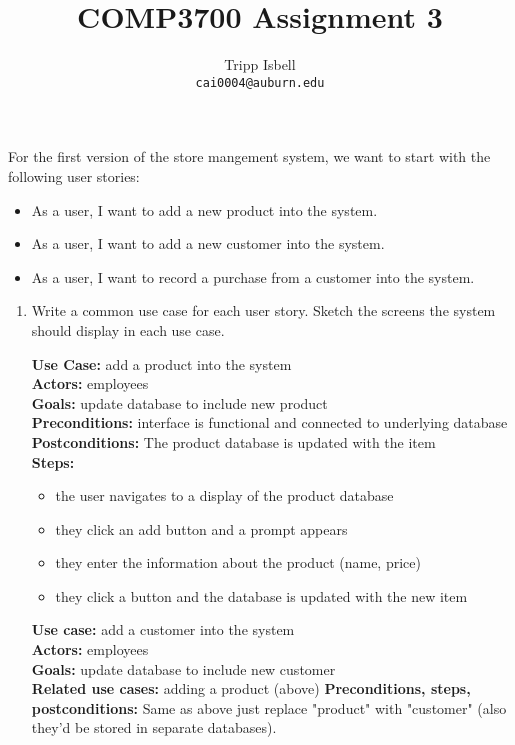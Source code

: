 \documentclass[notitlepage]{report}
\title{COMP3700 Assignment 3}
\author{Tripp Isbell\\
	\texttt{cai0004@auburn.edu}}
\date{}
\begin{document}
\maketitle
For the first version of the store mangement system, we want to start with the following user stories:
\begin{itemize}
	\item As a user, I want to add a new product into the system.
	\item As a user, I want to add a new customer into the system.
	\item As a user, I want to record a purchase from a customer into the system.
\end{itemize}
\begin{enumerate}[itemindent=-1.5em]
	\item Write a common use case for each user story. Sketch the screens the system should display in each use case.
	
	\textbf{Use Case:} add a product into the system\\
	\textbf{Actors:} employees\\
	\textbf{Goals:} update database to include new product\\
	\textbf{Preconditions:} interface is functional and connected to underlying database\\
	\textbf{Postconditions:} The product database is updated with the item\\
	\textbf{Steps:}
		\begin{itemize}
		\item the user navigates to a display of the product database
		\item they click an add button and a prompt appears
		\item they enter the information about the product (name, price)
		\item they click a button and the database is updated with the new item
		\end{itemize}
		
	\textbf{Use case:} add a customer into the system\\
	\textbf{Actors:} employees\\
	\textbf{Goals:} update database to include new customer\\
	\textbf{Related use cases:} adding a product (above)
	\textbf{Preconditions, steps, postconditions:} Same as above just replace "product" with "customer" (also they'd be stored in separate databases).
	

\end{enumerate}
\end{document}
